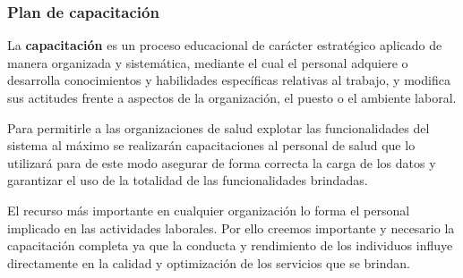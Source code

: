 \documentclass[a4paper,12pt]{article}
\begin{document}
 

\subsubsection{Plan de capacitación}
La \textbf{capacitación} es un proceso educacional de carácter estratégico aplicado de
manera organizada y sistemática, mediante el cual el personal adquiere o desarrolla
conocimientos y habilidades específicas relativas al trabajo, y modifica sus actitudes
frente a aspectos de la organización, el puesto o el ambiente laboral.

Para permitirle a las organizaciones de salud explotar las funcionalidades del sistema al máximo se realizarán capacitaciones al personal de salud que lo utilizará para de este modo asegurar de forma correcta la carga de los datos y garantizar el uso de la totalidad de las funcionalidades brindadas.



El recurso más importante en cualquier organización lo forma el personal implicado
en las actividades laborales. Por ello creemos importante y necesario la capacitación completa ya que  la conducta y rendimiento de los individuos influye
directamente en la calidad y optimización de los servicios que se brindan.



\end{document}
